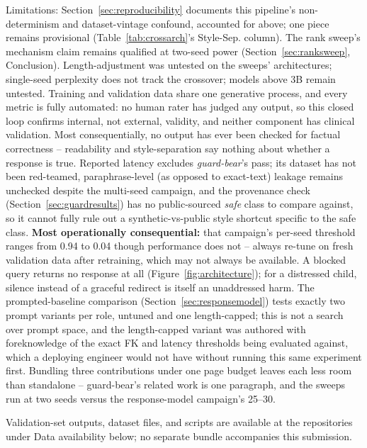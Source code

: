 \documentclass[pdflatex,sn-mathphys-num]{sn-jnl-official}%
\begin{document}
Limitations: Section~\ref{sec:reproducibility} documents this pipeline's non-determinism and dataset-vintage confound, accounted for above; one piece remains provisional (Table~\ref{tab:crossarch}'s Style-Sep. column). The rank sweep's mechanism claim remains qualified at two-seed power (Section~\ref{sec:ranksweep}, Conclusion). Length-adjustment was untested on the sweeps' architectures; single-seed perplexity does not track the crossover; models above 3B remain untested. Training and validation data share one generative process, and every metric is fully automated: no human rater has judged any output, so this closed loop confirms internal, not external, validity, and neither component has clinical validation. Most consequentially, no output has ever been checked for factual correctness -- readability and style-separation say nothing about whether a response is true. Reported latency excludes \textit{guard-bear}'s pass; its dataset has not been red-teamed, paraphrase-level (as opposed to exact-text) leakage remains unchecked despite the multi-seed campaign, and the provenance check (Section~\ref{sec:guardresults}) has no public-sourced \emph{safe} class to compare against, so it cannot fully rule out a synthetic-vs-public style shortcut specific to the safe class. \textbf{Most operationally consequential:} that campaign's per-seed threshold ranges from 0.94 to 0.04 though performance does not -- always re-tune on fresh validation data after retraining, which may not always be available. A blocked query returns no response at all (Figure~\ref{fig:architecture}); for a distressed child, silence instead of a graceful redirect is itself an unaddressed harm. The prompted-baseline comparison (Section~\ref{sec:responsemodel}) tests exactly two prompt variants per role, untuned and one length-capped; this is not a search over prompt space, and the length-capped variant was authored with foreknowledge of the exact FK and latency thresholds being evaluated against, which a deploying engineer would not have without running this same experiment first. Bundling three contributions under one page budget leaves each less room than standalone -- guard-bear's related work is one paragraph, and the sweeps run at two seeds versus the response-model campaign's 25--30.

\backmatter


Validation-set outputs, dataset files, and scripts are available at the repositories under Data availability below; no separate bundle accompanies this submission.
\end{document}
